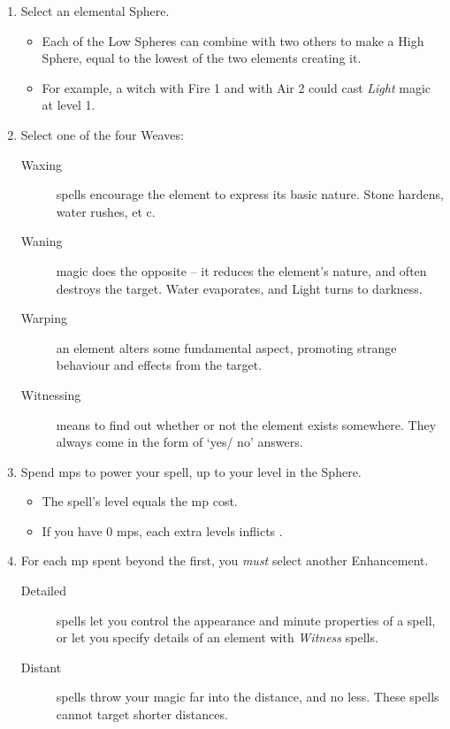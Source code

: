 \begin{multicols}{2}
\begin{enumerate}
  \item
  Select an elemental Sphere.
  \begin{itemize}
    \item
    Each of the Low Spheres can combine with two others to make a High Sphere, equal to the lowest of the two elements creating it.
    \item
    For example, a witch with Fire 1 and with Air 2 could cast \textit{Light} magic at level 1.
  \end{itemize}
  \item
  Select one of the four Weaves:
  \begin{description}
    \item[Waxing]
    spells encourage the element to express its basic nature.
    Stone hardens, water rushes, et c.
    \item[Waning]
    magic does the opposite -- it reduces the element's nature, and often destroys the target.
    Water evaporates, and Light turns to darkness.
    \item[Warping]
    an element alters some fundamental aspect, promoting strange behaviour and effects from the target.
    \item[Witnessing]
    means to find out whether or not the element exists somewhere.
    They always come in the form of `yes/ no' answers.
  \end{description}
  \item
  Spend \glspl{mp} to power your spell, up to your level in the Sphere.
  \begin{itemize}
    \item
    The spell's level equals the \gls{mp} cost.
    \item
    If you have 0 \glspl{mp}, each extra levels inflicts .
  \end{itemize}
  \item
  For each \gls{mp} spent beyond the first, you \emph{must} select another Enhancement.
  \begin{description}
    \item[Detailed]
    spells let you control the appearance and minute properties of a spell, or let you specify details of an element with \textit{Witness} spells. 
    \item[Distant]
    spells throw your magic far into the distance, and no less.
    These spells cannot target shorter distances.


\end{description}
\end{enumerate}
\end{multicols}
